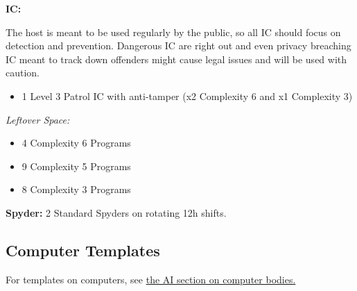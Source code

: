 \begin{multicols}{2}
	\textbf{IC:}
	
	The host is meant to be used regularly by the public, so all IC should focus on detection and prevention. Dangerous IC are right out and even privacy breaching IC meant to track down offenders might cause legal issues and will be used with caution.
	
	\begin{itemize}
		\itemsep 0pt
		\item 1 Level 3 Patrol IC with anti-tamper (x2 Complexity 6 and x1 Complexity 3)
	\end{itemize}
	
	
	\textit{Leftover Space:}
	\begin{itemize}
		\itemsep 0pt
		\item 4 Complexity 6 Programs
		\item 9 Complexity 5 Programs
		\item 8 Complexity 3 Programs
	\end{itemize}
	
	\textbf{Spyder:}
	2 Standard Spyders on rotating 12h shifts.
	
	
	\subsection*{Computer Templates}
	
	For templates on computers, see \hyperref[ai_computer]{the AI section on computer bodies.}
	
\end{multicols}